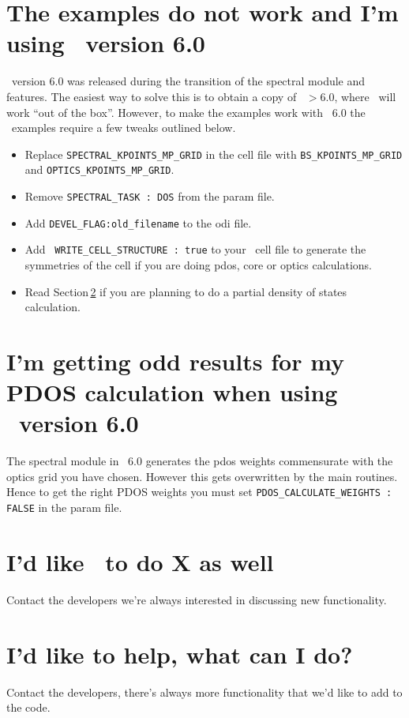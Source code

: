 \documentclass[a4paper,11pt,twoside]{book}
\begin{document}
{\section{The examples do not work and I'm using \castep\ version 6.0}
\castep\ version 6.0 was released during the transition of the spectral module and features. The easiest way to solve this is to obtain a  copy of \castep\ $>6.0$, where \optados\ will work ``out of the box''.  However, to make the examples work with \castep\ 6.0 the \optados\ examples require a few tweaks outlined below.
\begin{itemize}
\item Replace \verb#SPECTRAL_KPOINTS_MP_GRID# in the cell file with \verb#BS_KPOINTS_MP_GRID# and \verb#OPTICS_KPOINTS_MP_GRID#.
\item Remove \verb#SPECTRAL_TASK : DOS# from the param file.
\item Add \verb#DEVEL_FLAG:old_filename# to the odi file.
\item Add \verb# WRITE_CELL_STRUCTURE : true# to your \castep\ cell file to generate the symmetries of the cell if you are doing pdos, core or optics calculations.
\item Read Section\,\ref{pdos_castep_6.0} if you are planning to do a partial density of states calculation.
\end{itemize}

\section{I'm getting odd results for my PDOS calculation when using \castep\ version 6.0} \label{pdos_castep_6.0}
The spectral module in \castep\ 6.0 generates the pdos weights commensurate with the optics grid you have chosen. However this gets overwritten by the main routines. Hence to get the right PDOS weights you must set \verb#PDOS_CALCULATE_WEIGHTS : FALSE# in the param file.

\section{I'd like \optados\ to do X as well}
Contact the developers we're always interested in discussing new functionality.

\section{I'd like to help, what can I do?}
Contact the developers, there's always more functionality that we'd
like to add to the code.  

}
\end{document}
